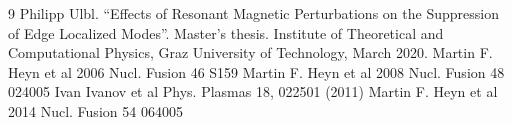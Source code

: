 \documentclass[11pt]{article}
\begin{document}
	\begin{thebibliography}{9}
		 Philipp Ulbl. “Effects of Resonant Magnetic Perturbations on the Suppression of Edge Localized Modes”. Master’s thesis. Institute of Theoretical and Computational Physics, Graz University of Technology, March 2020.
		 Martin F. Heyn et al 2006 Nucl. Fusion 46 S159
		 Martin F. Heyn et al 2008 Nucl. Fusion 48 024005
		 Ivan Ivanov et al Phys. Plasmas 18, 022501 (2011)
		 Martin F. Heyn et al 2014 Nucl. Fusion 54 064005
	\end{thebibliography}
\end{document}
